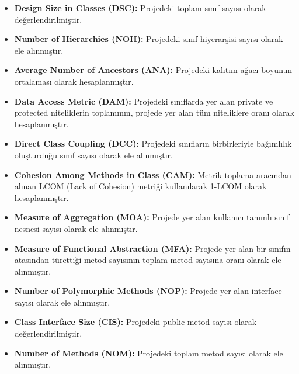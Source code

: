 \documentclass[conference]{IEEEtran}
\begin{document}
\begin{itemize}
	\item \textbf{Design Size in Classes (DSC):} Projedeki toplam sınıf sayısı olarak değerlendirilmiştir.
	\item \textbf{Number of Hierarchies (NOH):} Projedeki sınıf hiyerarşisi sayısı olarak ele alınmıştır.
	\item \textbf{Average Number of Ancestors (ANA):} Projedeki kalıtım ağacı boyunun ortalaması olarak hesaplanmıştır.
	\item \textbf{Data Access Metric (DAM):} Projedeki sınıflarda yer alan private ve protected niteliklerin toplamının, projede yer alan tüm niteliklere oranı olarak hesaplanmıştır.
	\item \textbf{Direct Class Coupling (DCC):} Projedeki sınıfların birbirleriyle bağımlılık oluşturduğu sınıf sayısı olarak ele alınmıştır.
	\item \textbf{Cohesion Among Methods in Class (CAM):} Metrik toplama aracından alınan LCOM (Lack of Cohesion) metriği kullanılarak 1-LCOM olarak hesaplanmıştır.
	\item \textbf{Measure of Aggregation (MOA):} Projede yer alan kullanıcı tanımlı sınıf nesnesi sayısı olarak ele alınmıştır.
	\item \textbf{Measure of Functional Abstraction (MFA):} Projede yer alan bir sınıfın atasından türettiği metod sayısının toplam metod sayısına oranı olarak ele alınmıştır.
	\item \textbf{Number of Polymorphic Methods (NOP):} Projede yer alan interface sayısı olarak ele alınmıştır.
	\item \textbf{Class Interface Size (CIS):} Projedeki public metod sayısı olarak değerlendirilmiştir.
	\item \textbf{Number of Methods (NOM):} Projedeki toplam metod sayısı olarak ele alınmıştır.
\end{itemize}
\end{document}
